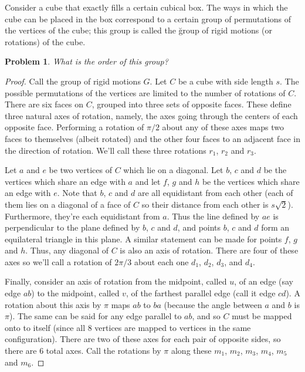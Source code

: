 \documentclass{article}
\newtheorem{problem}{Problem}
\begin{document}

Consider a cube that exactly fills a certain cubical box. The ways in which the cube can be placed in the box correspond to a certain group of permutations of the vertices of the cube; this group is called the \u{group of rigid motions} (or rotations) of the cube.

\begin{problem}
What is the order of this group?
\end{problem}
\begin{proof}
Call the group of rigid motions $G$. Let $C$ be a cube with side length $s$. The possible permutations of the vertices are limited to the number of rotations of $C$. There are six faces on $C$, grouped into three sets of opposite faces. These define three natural axes of rotation, namely, the axes going through the centers of each opposite face. Performing a rotation of $\pi/2$ about any of these axes maps two faces to themselves (albeit rotated) and the other four faces to an adjacent face in the direction of rotation. We'll call these three rotations $r_1$, $r_2$ and $r_3$.

Let $a$ and $e$ be two vertices of $C$ which lie on a diagonal. Let $b$, $c$ and $d$ be the vertices which share an edge with $a$ and let $f$, $g$ and $h$ be the vertices which share an edge with $e$. Note that $b$, $c$ and $d$ are all equidistant from each other (each of them lies on a diagonal of a face of $C$ so their distance from each other is $s \sqrt{2}$). Furthermore, they're each equidistant from $a$. Thus the line defined by $ae$ is perpendicular to the plane defined by $b$, $c$ and $d$, and points $b$, $c$ and $d$ form an equilateral triangle in this plane. A similar statement can be made for points $f$, $g$ and $h$. Thus, any diagonal of $C$ is also an axis of rotation. There are four of these axes so we'll call a rotation of $2\pi/3$ about each one $d_1$, $d_2$, $d_3$, and $d_4$.

Finally, consider an axis of rotation from the midpoint, called $u$, of an edge (say edge $ab$) to the midpoint, called $v$, of the farthest parallel edge (call it edge $cd$). A rotation about this axis by $\pi$ maps $ab$ to $ba$ (because the angle between $a$ and $b$ is $\pi$). The same can be said for any edge parallel to $ab$, and so $C$ must be mapped onto to itself (since all $8$ vertices are mapped to vertices in the same configuration). There are two of these axes for each pair of opposite sides, so there are $6$ total axes. Call the rotations by $\pi$ along these $m_1$, $m_2$, $m_3$, $m_4$, $m_5$ and $m_6$.


\end{proof}
\end{document}
